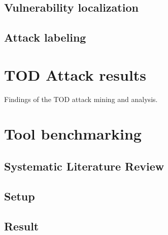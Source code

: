 \documentclass[draft,final]{vutinfth} %
\begin{document}
\section{Vulnerability localization}

\section{Attack labeling}

\chapter{TOD Attack results}

Findings of the TOD attack mining and analysis.

\chapter{Tool benchmarking}

\section{Systematic Literature Review}

\section{Setup}

\section{Result}




\backmatter

\listoffigures %

\cleardoublepage %
\listoftables %

\listofalgorithms
{}

\printindex

\printglossaries



\end{document}
